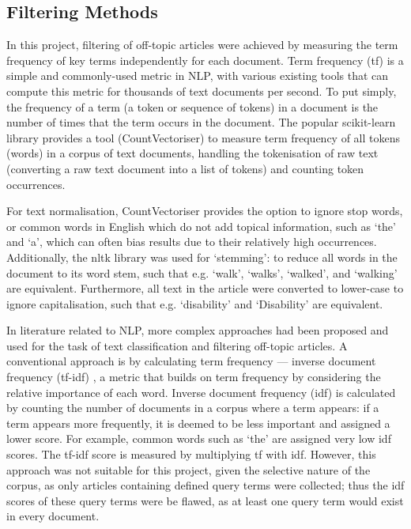 \documentclass{report}
\begin{document}
\subsection{Filtering Methods} \label{tc-filtering}
In this project, filtering of off-topic articles were achieved by measuring the term frequency of key terms independently for each document.
Term frequency (tf) is a simple and commonly-used metric in NLP, with various existing tools that can compute this metric for thousands of text documents per second.
To put simply, the frequency of a term (a token or sequence of tokens) in a document is the number of times that the term occurs in the document.
The popular scikit-learn library \cite{Scikit-learn} provides a tool (CountVectoriser) to measure term frequency of all tokens (words) in a corpus of text documents, handling the tokenisation of raw text (converting a raw text document into a list of tokens) and counting token occurrences.

For text normalisation, CountVectoriser provides the option to ignore stop words, or common words in English which do not add topical information, such as `the' and `a', which can often bias results due to their relatively high occurrences.
Additionally, the nltk library \cite{Nltk} was used for `stemming': to reduce all words in the document to its word stem, such that e.g. `walk', `walks', `walked', and `walking' are equivalent.
Furthermore, all text in the article were converted to lower-case to ignore capitalisation, such that e.g. `disability' and `Disability' are equivalent.

In literature related to NLP, more complex approaches had been proposed and used for the task of text classification and filtering off-topic articles.
A conventional approach is by calculating term frequency --- inverse document frequency (tf-idf) \cite{robertson2004understanding, sparck1972statistical}, a metric that builds on term frequency by considering the relative importance of each word.
Inverse document frequency (idf) is calculated by counting the number of documents in a corpus where a term appears: if a term appears more frequently, it is deemed to be less important and assigned a lower score.
For example, common words such as `the' are assigned very low idf scores.
The tf-idf score is measured by multiplying tf with idf.
However, this approach was not suitable for this project, given the selective nature of the corpus, as only articles containing defined query terms were collected; thus the idf scores of these query terms were be flawed, as at least one query term would exist in every document.
\end{document}
